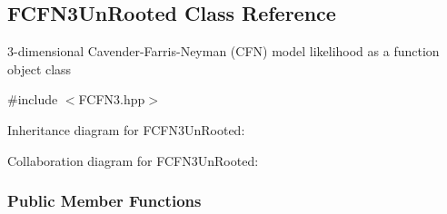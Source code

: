 \hypertarget{classFCFN3UnRooted}{\subsection{\-F\-C\-F\-N3\-Un\-Rooted \-Class \-Reference}
\label{classFCFN3UnRooted}
}


3-\/dimensional \-Cavender-\/\-Farris-\/\-Neyman (\-C\-F\-N) model likelihood as a function object class  




{\ttfamily \#include $<$\-F\-C\-F\-N3.\-hpp$>$}



\-Inheritance diagram for \-F\-C\-F\-N3\-Un\-Rooted\-:


\-Collaboration diagram for \-F\-C\-F\-N3\-Un\-Rooted\-:
\subsubsection*{\-Public \-Member \-Functions}
